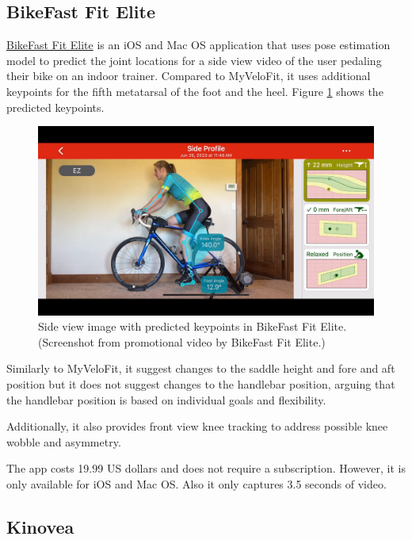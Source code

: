 \subsection{BikeFast Fit Elite}
\href{https://www.bikefastfit.com/}{BikeFast Fit Elite} is an iOS and Mac OS application that uses pose estimation model to predict the joint locations for a side view video of the user pedaling their bike on an indoor trainer. Compared to MyVeloFit, it uses additional keypoints for the fifth metatarsal of the foot and the heel. Figure \ref{fig:bikefastfit_keypoints} shows the predicted keypoints.

\begin{figure}[htbp]
    \centering
    \includegraphics[width=\textwidth]{obrazky-figures/bike_fast_fit_elite.png}
    \caption{Side view image with predicted keypoints in BikeFast Fit Elite. (Screenshot from promotional video \cite{bikeFastFitElitev2Youtube} by BikeFast Fit Elite.)}
    \label{fig:bikefastfit_keypoints}
\end{figure}

Similarly to MyVeloFit, it suggest changes to the saddle height and fore and aft position but it does not suggest changes to the handlebar position, arguing that the handlebar position is based on individual goals and flexibility.

Additionally, it also provides front view knee tracking to address possible knee wobble and asymmetry.

The app costs 19.99 US dollars and does not require a subscription. However, it is only available for iOS and Mac OS. Also it only captures 3.5 seconds of video.


\subsection{Kinovea}


